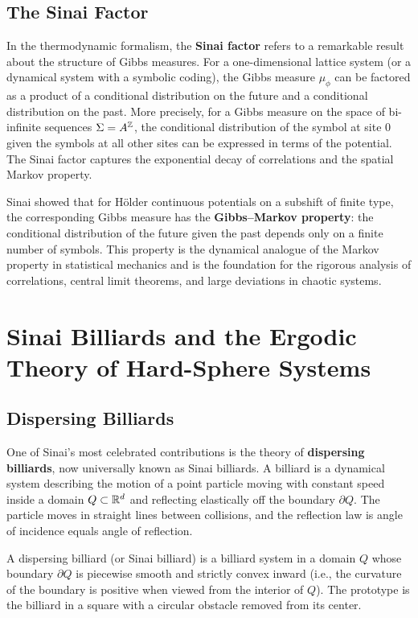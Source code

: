 \subsection{The Sinai Factor}

In the thermodynamic formalism, the \textbf{Sinai factor} refers to a remarkable result about the structure of Gibbs measures. For a one-dimensional lattice system (or a dynamical system with a symbolic coding), the Gibbs measure \(\mu_\phi\) can be factored as a product of a conditional distribution on the future and a conditional distribution on the past. More precisely, for a Gibbs measure on the space of bi-infinite sequences \(\Sigma = A^{\mathbb{Z}}\), the conditional distribution of the symbol at site \(0\) given the symbols at all other sites can be expressed in terms of the potential. The Sinai factor captures the exponential decay of correlations and the spatial Markov property.

Sinai showed that for H\"older continuous potentials on a subshift of finite type, the corresponding Gibbs measure has the \textbf{Gibbs--Markov property}: the conditional distribution of the future given the past depends only on a finite number of symbols. This property is the dynamical analogue of the Markov property in statistical mechanics and is the foundation for the rigorous analysis of correlations, central limit theorems, and large deviations in chaotic systems.

\section{Sinai Billiards and the Ergodic Theory of Hard-Sphere Systems}

\subsection{Dispersing Billiards}

One of Sinai's most celebrated contributions is the theory of \textbf{dispersing billiards}, now universally known as Sinai billiards. A billiard is a dynamical system describing the motion of a point particle moving with constant speed inside a domain \(Q \subset \mathbb{R}^d\) and reflecting elastically off the boundary \(\partial Q\). The particle moves in straight lines between collisions, and the reflection law is angle of incidence equals angle of reflection.

\begin{definition}
A dispersing billiard (or Sinai billiard) is a billiard system in a domain \(Q\) whose boundary \(\partial Q\) is piecewise smooth and strictly convex inward (i.e., the curvature of the boundary is positive when viewed from the interior of \(Q\)). The prototype is the billiard in a square with a circular obstacle removed from its center.
\end{definition}

